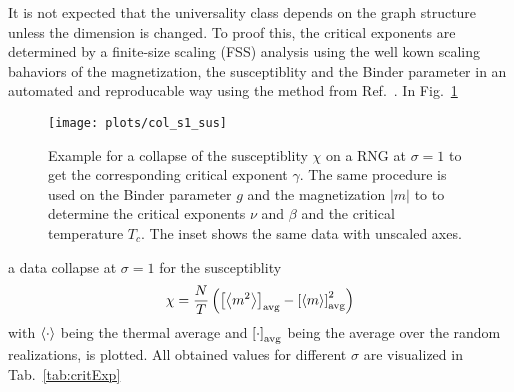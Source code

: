 It is not expected that the universality class depends on the graph
structure unless the dimension is changed.
To proof this, the critical exponents are determined by a finite-size
scaling (FSS) analysis using the well kown scaling bahaviors of the
magnetization, the susceptiblity and the Binder parameter
in an automated and reproducable way using the
method from Ref.~\cite{autoscale2009}.
In Fig.~\ref{fig:collapse}
\begin{figure}[htb]
    \texttt{[image: plots/col\_s1\_sus]}
    \caption[Examples of Determining Critical Temperature and Exponents]
    {
        Example for a collapse of the susceptiblity \(\chi\) on a RNG at
        \(\sigma = 1\) to get the corresponding critical exponent $\gamma$.
        The same procedure is used on the Binder parameter $g$ and the
        magnetization $|m|$ to to determine the critical exponents
        \(\nu\) and \(\beta\) and the critical temperature \(T_c\).
        The inset shows the same data with unscaled axes.
    }
    \label{fig:collapse}
\end{figure}
a data collapse at $\sigma = 1$ for the susceptiblity
\[\chi = \frac{N}{T}\left(\left[ \left< m^2 \right> \right] _{\mathrm{avg}}-\left[ \left< m \right> \right] _{\mathrm{avg}}^2\right)\]
with $\left< \cdot \right>$ being the thermal average and $\left[ \cdot \right] _{\mathrm{avg}}$ being the
average over the random realizations, is plotted.
All obtained values for different $\sigma$ are visualized in Tab.~\ref{tab:critExp}
